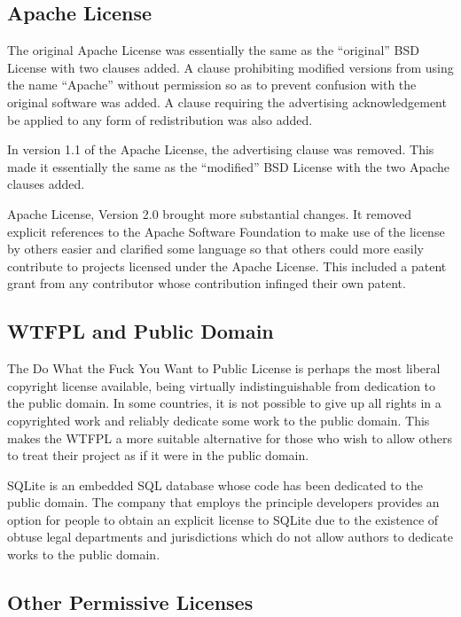 \documentclass[12pt,letterpaper]{article}
\begin{document}
\subsection{Apache License}

The original Apache License was essentially the same as the ``original'' BSD License with two clauses added. A clause prohibiting modified versions from using the name ``Apache'' without permission so as to prevent confusion with the original software was added. A clause requiring the advertising acknowledgement be applied to any form of redistribution was also added.

In version 1.1 of the Apache License, the advertising clause was removed. This made it essentially the same as the ``modified'' BSD License with the two Apache clauses added.

Apache License, Version 2.0 brought more substantial changes. It removed explicit references to the Apache Software Foundation to make use of the license by others easier and clarified some language so that others could more easily contribute to projects licensed under the Apache License. This included a patent grant from any contributor whose contribution infinged their own patent.

\subsection{WTFPL and Public Domain}

The Do What the Fuck You Want to Public License is perhaps the most liberal copyright license available, being virtually indistinguishable from dedication to the public domain. In some countries, it is not possible to give up all rights in a copyrighted work and reliably dedicate some work to the public domain. This makes the WTFPL a more suitable alternative for those who wish to allow others to treat their project as if it were in the public domain.

SQLite is an embedded SQL database whose code has been dedicated to the public domain. The company that employs the principle developers provides an option for people to obtain an explicit license to SQLite due to the existence of obtuse legal departments and jurisdictions which do not allow authors to dedicate works to the public domain.

\subsection{Other Permissive Licenses}
\end{document}
